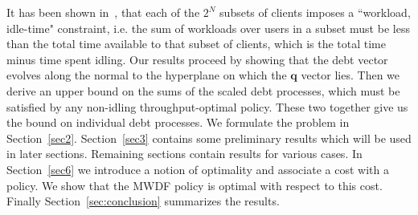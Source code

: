 \documentclass[letterpaper, 10 pt, conference]{ieeeconf}
\begin{document}
It has been shown in~\cite{c3}, that each of the $2^{N}$ subsets of clients imposes a ``workload, idle-time" constraint, i.e. the sum of workloads over users in a subset must be less than the total time available to that subset of clients, which is the total time minus time spent idling. 
 Our results proceed by showing that the debt vector evolves along the normal to the hyperplane on which the $\bm{q}$ vector lies. Then we derive an upper bound on the sums of the scaled debt processes, which must be satisfied by any non-idling throughput-optimal policy. These two together give us the bound on individual debt processes.
We formulate the problem in Section~\ref{sec2}. Section~\ref{sec3} contains some preliminary results which will be used in later sections. Remaining sections contain results for various cases. In Section~\ref{sec6} we introduce a notion of optimality and associate a cost with a policy. We show that the MWDF policy is optimal with respect to this cost. Finally Section~\ref{sec:conclusion} summarizes the results. 
\end{document}
